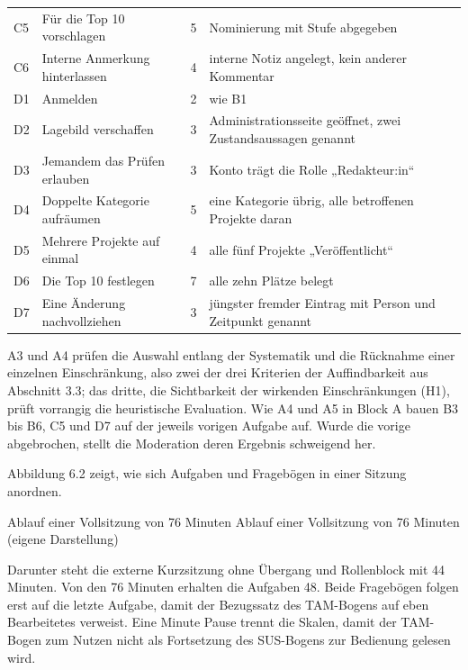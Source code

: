 \begin{longtable}{@{}L{1.4cm}L{4.3cm}L{1.5cm}L{6.6cm}@{}}
	C5 & Für die Top 10 vorschlagen & 5 & Nominierung mit Stufe abgegeben \\
	C6 & Interne Anmerkung hinterlassen & 4 & interne Notiz angelegt, kein anderer Kommentar \\
	D1 & Anmelden & 2 & wie B1 \\
	D2 & Lagebild verschaffen & 3 & Administrationsseite geöffnet, zwei Zustandsaussagen genannt \\
	D3 & Jemandem das Prüfen erlauben & 3 & Konto trägt die Rolle „Redakteur:in“ \\
	D4 & Doppelte Kategorie aufräumen & 5 & eine Kategorie übrig, alle betroffenen Projekte daran \\
	D5 & Mehrere Projekte auf einmal & 4 & alle fünf Projekte „Veröffentlicht“ \\
	D6 & Die Top 10 festlegen & 7 & alle zehn Plätze belegt \\
	D7 & Eine Änderung nachvollziehen & 3 & jüngster fremder Eintrag mit Person und Zeitpunkt genannt \\
\end{longtable}
\endgroup

A3 und A4 prüfen die Auswahl entlang der Systematik und die Rücknahme einer einzelnen Einschränkung, also zwei der drei Kriterien der Auffindbarkeit aus Abschnitt 3.3; das dritte, die Sichtbarkeit der wirkenden Einschränkungen (H1), prüft vorrangig die heuristische Evaluation. Wie A4 und A5 in Block A bauen B3 bis B6, C5 und D7 auf der jeweils vorigen Aufgabe auf. Wurde die vorige abgebrochen, stellt die Moderation deren Ergebnis schweigend her.

Abbildung 6.2 zeigt, wie sich Aufgaben und Fragebögen in einer Sitzung anordnen.

%
{Ablauf einer Vollsitzung von 76 Minuten}%
{Ablauf einer Vollsitzung von 76 Minuten (eigene Darstellung)}

Darunter steht die externe Kurzsitzung ohne Übergang und Rollenblock mit 44 Minuten. Von den 76 Minuten erhalten die Aufgaben 48. Beide Fragebögen folgen erst auf die letzte Aufgabe, damit der Bezugssatz des TAM-Bogens auf eben Bearbeitetes verweist. Eine Minute Pause trennt die Skalen, damit der TAM-Bogen zum Nutzen nicht als Fortsetzung des SUS-Bogens zur Bedienung gelesen wird.


